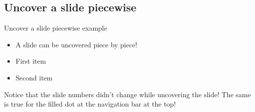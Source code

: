 \subsection{Uncover a slide piecewise}
  
\begin{frame}{Uncover a slide piecewise example}

  \begin{itemize}
    \item A slide can be uncovered piece by piece! \pause
    \item First item 
    \item Second item \pause
  \end{itemize}
  
  \vspace{0.4cm}
  
  Notice that the slide numbers didn't change while uncovering the slide! The same is true for the filled dot at the navigation bar at the top!

\end{frame}